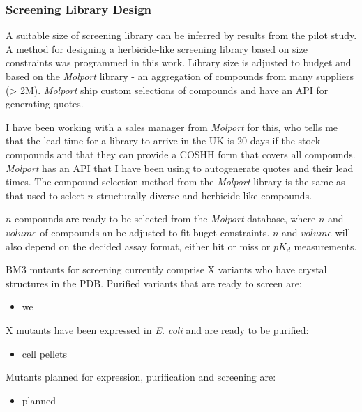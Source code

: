 \documentclass{article}
\begin{document}
\subsubsection{Screening Library Design}
A suitable size of screening library can be inferred by results from the pilot study. %
A method for designing a herbicide-like screening library based on size constraints was programmed in this work. Library size is adjusted to budget and based on the \textit{Molport} library - an aggregation of compounds from many suppliers (> 2M). \textit{Molport} ship custom selections of compounds and have an API for generating quotes. %
\par
I have been working with a sales manager from \textit{Molport} for this, who tells me that the lead time for a library to arrive in the UK is 20 days if the stock compounds and that they can provide a COSHH form that covers all compounds. \textit{Molport} has an API that I have been using to autogenerate quotes and their lead times. The compound selection method from the \textit{Molport} library is the same as that used to select $n$ structurally diverse and herbicide-like compounds.  %
\par
$n$ compounds are ready to be selected from the \textit{Molport} database, where $n$ and $volume$ of compounds an be adjusted to fit buget constraints. $n$ and $volume$ will also depend on the decided assay format, either hit or miss or $pK_d$ measurements. %
\par
BM3 mutants for screening currently comprise X variants who have crystal structures in the PDB. Purified variants that are ready to screen are:%
\begin{itemize} %
	\item we
\end{itemize}
X mutants have been expressed in \textit{E. coli} and are ready to be purified:
\begin{itemize} %
	\item cell pellets
\end{itemize}
\par
Mutants planned for expression, purification and screening are: %
\begin{itemize} %
	\item planned
\end{itemize}
\par
\end{document}
